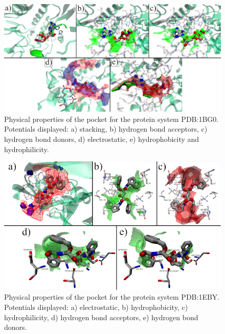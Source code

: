 \begin{figure}[H]
  \centering
  \includegraphics[width=1\textwidth]{figures/appendix/benchmark_prot/1bg0.png}
  \caption{\label{fig:appx_benchmark/1bg0} Physical properties of the pocket for the protein system PDB:1BG0. Potentials displayed: a) stacking, b) hydrogen bond acceptors, c) hydrogen bond donors, d) electrostatic, e) hydrophobicity and hydrophilicity.}
\end{figure}

\begin{figure}[H]
  \centering
  \includegraphics[width=1\textwidth]{figures/appendix/benchmark_prot/1eby.png}
  \caption{\label{fig:appx_benchmark/1eby} Physical properties of the pocket for the protein system PDB:1EBY. Potentials displayed: a) electrostatic, b) hydrophobicity, c) hydrophilicity, d) hydrogen bond acceptors, e) hydrogen bond donors.}
\end{figure}

